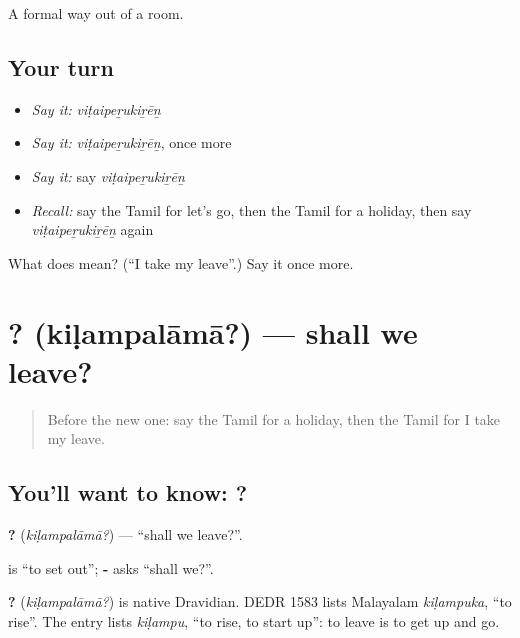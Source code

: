 \begin{grammarlens}[title={What you've built}]
A formal way out of a room.
\end{grammarlens}

\subsection*{Your turn}
\begin{itemize}
\raggedright
  \item \emph{Say it:} \emph{viṭaipeṟukiṟēṉ}
  \item \emph{Say it:} \emph{viṭaipeṟukiṟēṉ}, once more
  \item \emph{Say it:} say \emph{viṭaipeṟukiṟēṉ}
  \item \emph{Recall:} say the Tamil for let's go, then the Tamil for a holiday, then say \emph{viṭaipeṟukiṟēṉ} again
\end{itemize}

\begin{tcolorbox}[breakable,colback=teal!4,colframe=teal!35!black,title={Before you move on}]
What does  mean? (\textquotedblleft{}I take my leave\textquotedblright{}.) Say it once more.
\end{tcolorbox}
\section[\texorpdfstring{\ta{கிளம்பலாமா}? (kiḷampalāmā?)}{கிளம்பலாமா? (kiḷampalāmā?)}]{? (kiḷampalāmā?) — shall we leave?}

\label{lesson:TA-C107-shallwego}



\begin{quote}
Before the new one: say the Tamil for a holiday, then the Tamil for I take my leave.
\end{quote}

\subsection*{You'll want to know: ?}
\textbf{?} (\emph{kiḷampalāmā?}) — \textquotedblleft{}shall we leave?\textquotedblright{}.

\textbf{} is \textquotedblleft{}to set out\textquotedblright{}; \textbf{-} asks \textquotedblleft{}shall we?\textquotedblright{}.

\begin{cousinweb}
\textbf{?} (\emph{kiḷampalāmā?}) is native Dravidian. DEDR 1583 lists Malayalam \emph{kiḷampuka}, \textquotedblleft{}to rise\textquotedblright{}. The entry lists \emph{kiḷampu}, \textquotedblleft{}to rise, to start up\textquotedblright{}: to leave is to get up and go.
\end{cousinweb}

